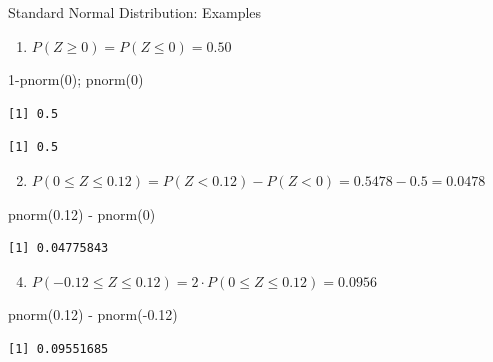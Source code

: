 \documentclass[
  ignorenonframetext,
]{beamer}
\newenvironment{Shaded}{\begin{snugshade}}{\end{snugshade}}
\newcommand{\DecValTok}[1]{\textcolor[rgb]{0.68,0.00,0.00}{#1}}
\newcommand{\FloatTok}[1]{\textcolor[rgb]{0.68,0.00,0.00}{#1}}
\newcommand{\FunctionTok}[1]{\textcolor[rgb]{0.28,0.35,0.67}{#1}}
\newcommand{\NormalTok}[1]{\textcolor[rgb]{0.00,0.23,0.31}{#1}}
\newcommand{\SpecialCharTok}[1]{\textcolor[rgb]{0.37,0.37,0.37}{#1}}
\providecommand{\tightlist}{%
  \setlength{\itemsep}{0pt}\setlength{\parskip}{0pt}}
\begin{document}
\begin{frame}[fragile]{Standard Normal Distribution: Examples}
\protect{}\label{standard-normal-distribution-examples}
\begin{enumerate}
\tightlist
\item
  \(P(Z \geq 0) = P(Z \leq 0) = 0.50\)
\end{enumerate}

\begin{Shaded}
\begin{Highlighting}[]
\DecValTok{1}\SpecialCharTok{{-}}\FunctionTok{pnorm}\NormalTok{(}\DecValTok{0}\NormalTok{); }\FunctionTok{pnorm}\NormalTok{(}\DecValTok{0}\NormalTok{)}
\end{Highlighting}
\end{Shaded}

\begin{verbatim}
[1] 0.5
\end{verbatim}

\begin{verbatim}
[1] 0.5
\end{verbatim}

\begin{enumerate}
\setcounter{enumi}{1}
\tightlist
\item
  \(P(0 \leq Z \leq 0.12) =P(Z<0.12)-P(Z<0)=0.5478-0.5 = 0.0478\)
\end{enumerate}

\begin{Shaded}
\begin{Highlighting}[]
\FunctionTok{pnorm}\NormalTok{(}\FloatTok{0.12}\NormalTok{) }\SpecialCharTok{{-}} \FunctionTok{pnorm}\NormalTok{(}\DecValTok{0}\NormalTok{)}
\end{Highlighting}
\end{Shaded}

\begin{verbatim}
[1] 0.04775843
\end{verbatim}

\begin{enumerate}
\setcounter{enumi}{3}
\tightlist
\item
  \(P(-0.12 \leq Z \leq 0.12) = 2 \cdot P(0 \leq Z \leq 0.12) = 0.0956\)
\end{enumerate}

\begin{Shaded}
\begin{Highlighting}[]
\FunctionTok{pnorm}\NormalTok{(}\FloatTok{0.12}\NormalTok{) }\SpecialCharTok{{-}} \FunctionTok{pnorm}\NormalTok{(}\SpecialCharTok{{-}}\FloatTok{0.12}\NormalTok{)}
\end{Highlighting}
\end{Shaded}

\begin{verbatim}
[1] 0.09551685
\end{verbatim}
\end{frame}
\end{document}

